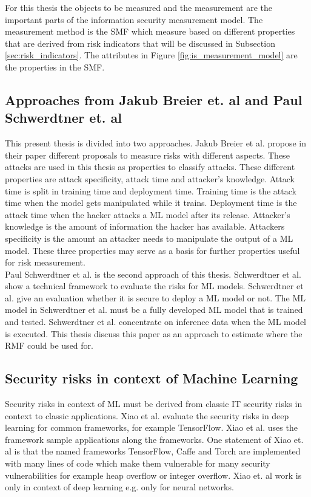 For this thesis the objects to be measured and the measurement are the important parts of the information security measurement model. The measurement method is the SMF which measure based on different properties that are derived from risk indicators that will be discussed in Subsection \ref{sec:risk_indicators}. The attributes in Figure \ref{fig:is_measurement_model} are the properties in the SMF.

\subsection{Approaches from Jakub Breier et. al and Paul Schwerdtner et. al}
\label{sec:approaches}

This present thesis is divided into two approaches. Jakub Breier et al. \cite{DBLP:journals/corr/abs-2012-04884} propose in their paper different proposals to measure risks with different aspects.
These attacks are used in this thesis as properties to classify attacks. These different properties are attack specificity, attack time and attacker's knowledge. Attack time is split in training time
and deployment time. Training time is the attack time when the model gets manipulated while it trains. Deployment time is the attack time when the hacker attacks a ML model after its release.
Attacker's knowledge is the amount of information the hacker has available. Attackers specificity is the amount an attacker needs to manipulate the output of a ML model. These three properties may
serve as a basis for further properties useful for risk measurement. \\
Paul Schwerdtner et al. \cite{DBLP:journals/corr/abs-2011-04328} is the second approach of this thesis. Schwerdtner et al. show a technical framework to evaluate the risks for ML models. Schwerdtner et
al. give an evaluation whether it is secure to deploy a ML model or not. The ML model in Schwerdtner et al. must be a fully developed ML model that is trained and tested. Schwerdtner et al. concentrate
on inference data when the ML model is executed. This thesis discuss this paper as an approach to estimate where the RMF could be used for.

\subsection{Security risks in context of Machine Learning}

Security risks in context of ML must be derived from classic IT security risks in context to classic applications.
Xiao et al. \cite{DBLP:conf/sp/XiaoLZX18} evaluate the security risks in deep learning for common frameworks, for example TensorFlow. Xiao et al. uses the framework sample applications along the
frameworks. One statement of Xiao et. al is that the named frameworks TensorFlow, Caffe and Torch are implemented with many lines of code which make them vulnerable for many security vulnerabilities
for example heap overflow or integer overflow. Xiao et. al work is only in context of deep learning e.g. only for neural networks.

